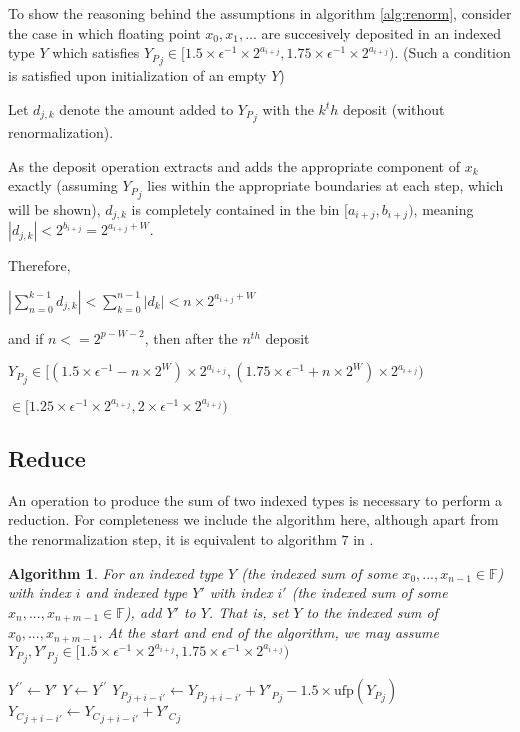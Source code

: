 \documentclass[12pt]{article}
\providecommand{\F}{\ensuremath{\mathbb{F}}}
\providecommand{\ufp}{\ensuremath{\text{ufp}}}
\theoremstyle{plain}
\newtheorem{alg}{Algorithm}[section]
\begin{document}
    To show the reasoning behind the assumptions in algorithm \ref{alg:renorm}, consider the case in which floating point $x_0, x_1, ...$ are succesively deposited in an indexed type $Y$ which satisfies ${Y_P}_j \in [1.5 \times \epsilon^{-1}\times 2^{a_{i + j}}, 1.75 \times \epsilon^{-1}\times 2^{a_{i + j}})$. (Such a condition is satisfied upon initialization of an empty $Y$)

    Let $d_{j, k}$ denote the amount added to ${Y_P}_j$ with the $k^th$ deposit (without renormalization).

    As the deposit operation extracts and adds the appropriate component of $x_k$ exactly (assuming ${Y_P}_j$ lies within the appropriate boundaries at each step, which will be shown), $d_{j, k}$ is completely contained in the bin $[a_{i + j}, b_{i + j})$, meaning $|d_{j, k}| < 2^{b_{i + j}} = 2^{a_{i + j} + W}$.

    Therefore,

    $|\sum \limits_{n = 0}^{k - 1} d_{j, k}| < \sum \limits_{k = 0}^{n - 1} |d_k| < n \times 2^{a_{i + j} + W}$

    and if $n <= 2^{p - W - 2}$, then after the $n^{th}$ deposit

    ${Y_P}_j \in [(1.5 \times \epsilon^{-1} - n \times 2^W)\times 2^{a_{i + j}}, (1.75 \times \epsilon^{-1} + n \times 2^W)\times 2^{a_{i + j}})$

    \indent\indent$\in [1.25 \times \epsilon^{-1}\times 2^{a_{i + j}}, 2 \times \epsilon^{-1}\times 2^{a_{i + j}})$

  \subsection{Reduce}
    An operation to produce the sum of two indexed types is necessary to perform a reduction. For completeness we include the algorithm here, although apart from the renormalization step, it is equivalent to algorithm $7$ in \cite{repsum}.
    \begin{alg}
      For an indexed type $Y$ (the indexed sum of some $x_0, ..., x_{n - 1} \in \F$) with index $i$ and indexed type $Y'$ with index $i'$ (the indexed sum of some $x_n, ..., x_{n + m - 1} \in \F$), add $Y'$ to $Y$. That is, set $Y$ to the indexed sum of $x_0, ..., x_{n + m - 1}$. At the start and end of the algorithm, we may assume ${Y_P}_j, {Y'_P}_j \in [1.5 \times \epsilon^{-1}\times 2^{a_{i + j}}, 1.75 \times \epsilon^{-1}\times 2^{a_{i + j}})$
      \begin{algorithmic}
            \State $Y^{\prime\prime} \gets Y'$
            \State {}
            \State $Y \gets Y^{\prime\prime}$
          \EndIf
            \State ${Y_P}_{j + i - i'} \gets {Y_P}_{j + i - i'} + {Y'_P}_j - 1.5 \times \ufp({Y_P}_j)$
            \State ${Y_C}_{j + i - i'} \gets {Y_C}_{j + i - i'} + {Y'_C}_j$
          \EndFor
          \State {}
        \EndFunction
      \end{algorithmic}
      \label{alg:reduce}
    \end{alg}
\end{document}
